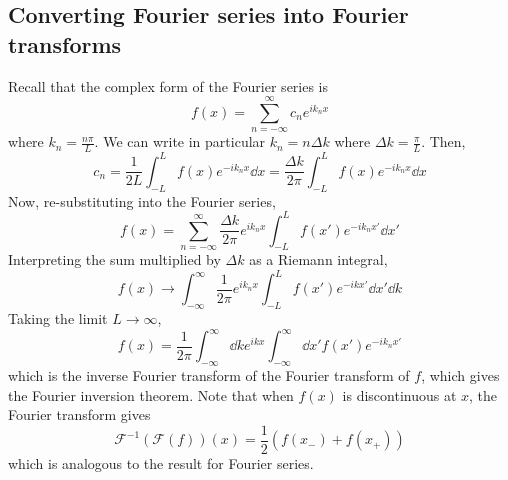 \subsection{Converting Fourier series into Fourier transforms}
Recall that the complex form of the Fourier series is
\[
	f(x) = \sum_{n=-\infty}^\infty c_n e^{ik_n x}
\]
where \( k_n = \frac{n\pi}{L} \).
We can write in particular \( k_n = n \Delta k \) where \( \Delta k = \frac{\pi}{L} \).
Then,
\[
	c_n = \frac{1}{2L} \int_{-L}^L f(x) e^{-ik_n x} \dd{x} = \frac{\Delta k}{2\pi} \int_{-L}^L f(x) e^{-ik_n x}\dd{x}
\]
Now, re-substituting into the Fourier series,
\[
	f(x) = \sum_{n=-\infty}^\infty \frac{\Delta k}{2\pi} e^{i k_n x} \int_{-L}^L f(x') e^{-ik_n x'} \dd{x'}
\]
Interpreting the sum multiplied by \( \Delta k \) as a Riemann integral,
\[
	f(x) \to \int_{-\infty}^\infty \frac{1}{2\pi} e^{i k_n x} \int_{-L}^L f(x') e^{-ik x'} \dd{x'} \dd{k}
\]
Taking the limit \( L \to \infty \),
\[
	f(x) = \frac{1}{2\pi} \int_{-\infty}^\infty \dd{k} e^{i k x} \int_{-\infty}^\infty \dd{x'} f(x') e^{-ik_n x'}
\]
which is the inverse Fourier transform of the Fourier transform of \( f \), which gives the Fourier inversion theorem.
Note that when \( f(x) \) is discontinuous at \( x \), the Fourier transform gives
\[
	\mathcal F^{-1}(\mathcal F(f))(x) = \frac{1}{2}(f(x_-) + f(x_+))
\]
which is analogous to the result for Fourier series.

